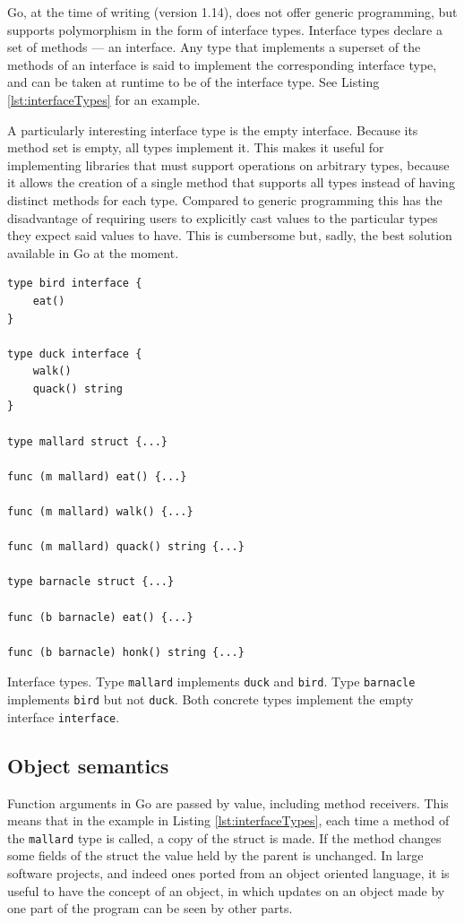 \documentclass[12pt,a4paper,oneside,openright]{report}
\newcommand{\mycaption}[2]{\caption[#1]{#1 #2}}
\newcommand{\goType}[1]{\texttt{#1}}
\begin{document}
Go, at the time of writing (version 1.14), does not offer generic
programming, but supports polymorphism in the form of interface
types. Interface types declare a set of methods --- an interface. Any
type that implements a superset of the methods of an interface is said
to implement the corresponding interface type, and can be taken at
runtime to be of the interface type. See Listing
\ref{lst:interfaceTypes} for an example.

A particularly interesting interface type is the empty
interface. Because its method set is empty, all types implement
it. This makes it useful for implementing libraries that must support
operations on arbitrary types, because it allows the creation of a
single method that supports all types instead of having distinct
methods for each type. Compared to generic programming this has the
disadvantage of requiring users to explicitly cast values to the
particular types they expect said values to have. This is cumbersome
but, sadly, the best solution available in Go at the moment.

\begin{Listing}[hbtp]
\begin{lstlisting}
type bird interface {
    eat()
}

type duck interface {
    walk()
    quack() string
}

type mallard struct {...}

func (m mallard) eat() {...}

func (m mallard) walk() {...}

func (m mallard) quack() string {...}

type barnacle struct {...}

func (b barnacle) eat() {...}

func (b barnacle) honk() string {...}
\end{lstlisting}

  \mycaption{Interface types.}{Type \goType{mallard} implements
    \goType{duck} and \goType{bird}. Type \goType{barnacle} implements
    \goType{bird} but not \goType{duck}. Both concrete types implement
    the empty interface \goType{interface\string{\string}}.}
  \label{lst:interfaceTypes}
\end{Listing}


\subsection{Object semantics}
\label{sec:prep:oop}

Function arguments in Go are passed by value, including method
receivers. This means that in the example in Listing
\ref{lst:interfaceTypes}, each time a method of the \goType{mallard}
type is called, a copy of the struct is made. If the method changes
some fields of the struct the value held by the parent is
unchanged. In large software projects, and indeed ones ported from an
object oriented language, it is useful to have the concept of an
object, in which updates on an object made by one part of the program
can be seen by other parts.
\end{document}
